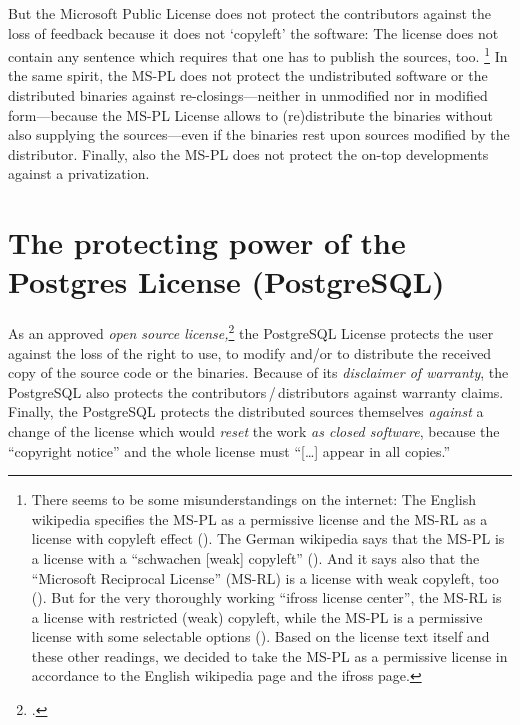 But the Microsoft Public License does not protect the contributors against the
loss of feedback because it does not `copyleft' the software: The license does
not contain any sentence which requires that one has to publish the sources,
too.%
  \footnote{There seems to be some misunderstandings on the internet: The
  English wikipedia specifies the MS-PL as a permissive license and the MS-RL as
  a license with copyleft effect (\cite[cf.][\nopage wp]{wpMsSharedSources2013a}).
  The German wikipedia says that the MS-PL is a license with a \enquote{schwachen
  [weak] copyleft} (\cite[cf.][\nopage wp]{wpMspl2013a}). And it says also that
  the \enquote{Microsoft Reciprocal License} (MS-RL) is a license with weak
  copyleft, too (\cite[cf.][\nopage wp]{wpMsrl2013a}). But for the very
  thoroughly working \enquote{ifross license center}, the MS-RL is a license
  with restricted (weak) copyleft, while the MS-PL is a permissive license with
  some selectable options (\cite[cf.][\nopage wp]{ifross2011a}). Based on the
  license text itself and these other readings, we decided to take the MS-PL as
  a permissive license in accordance to the English wikipedia page and the
  ifross page.}
In the same spirit, the MS-PL does not protect the undistributed
software or the distributed binaries against re-closings---neither in
unmodified nor in modified form---because the MS-PL License allows to
(re)distribute the binaries without also supplying the sources---even if the
binaries rest upon sources modified by the distributor. Finally, also the MS-PL
does not protect the on-top developments against a privatization.


\section{\texorpdfstring{The protecting power of the}{The} Postgres License
(PostgreSQL)}

As an approved \emph{open source license,}\footcite[cf.][\nopage wp]{OSI2012b}
the PostgreSQL License protects the user against the loss of the right to use,
to modify and/or to distribute the received copy of the source code or the
binaries.\citePGL{}
Because of its \emph{disclaimer of warranty}, the PostgreSQL also protects the
contributors\,/\,distributors against warranty claims.\citePGL{} Finally, the
PostgreSQL protects the distributed sources themselves \emph{against} a change of the
license which would \emph{reset} the work \emph{as closed software}, because the
\enquote{copyright notice} and the whole license must \enquote{[\ldots] appear
in all copies.}\citePGL{}

